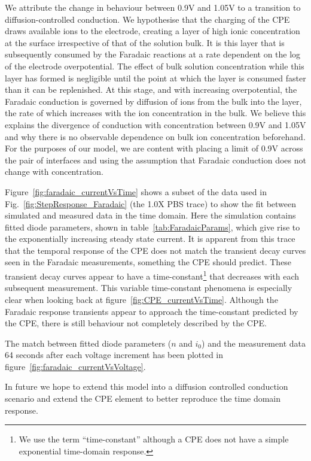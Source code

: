 \documentclass[journal, a4paper]{IEEEtran}
\begin{document}
We attribute the change in behaviour between 0.9\thinspace V and 1.05\thinspace V to a transition to diffusion-controlled conduction.
We hypothesise that the charging of the CPE draws available ions to the electrode, creating a layer of high ionic concentration at the surface irrespective of that of the solution bulk. It is this layer that is subsequently consumed by the Faradaic reactions at a rate dependent on the log of the electrode overpotential.  The effect of bulk solution concentration while this layer has formed is negligible until the point at which the layer is consumed faster than it can be replenished. At this stage, and with increasing overpotential, the Faradaic conduction is governed by diffusion of ions from the bulk into the layer, the rate of which increases with the ion concentration in the bulk. We believe this explains the divergence of conduction with concentration between 0.9\thinspace V and 1.05\thinspace V and why there is no observable dependence on bulk ion concentration beforehand.
For the purposes of our model, we are content with placing a limit of 0.9\thinspace V across the pair of interfaces and using the assumption that Faradaic conduction does not change with concentration.

{
    \color{blue}
    Figure~\ref{fig:faradaic_currentVsTime} shows a subset of the data used in Fig.~\ref{fig:StepResponse_Faradaic} (the 1.0X PBS trace) to show the fit between simulated and measured data in the time domain. Here the simulation contains fitted diode parameters, shown in table~\ref{tab:FaradaicParams}, which give rise to the exponentially increasing steady state current.
It is apparent from this trace that the temporal response of the CPE does not match the transient decay curves seen in the Faradaic measurements, something the CPE should predict. These transient decay curves appear to have a time-constant\footnote{We use the term ``time-constant'' although a CPE does not have a simple exponential time-domain response.} that decreases with each subsequent measurement. This variable time-constant phenomena is especially clear when looking back at figure~\ref{fig:CPE_currentVsTime}. Although the Faradaic response transients appear to approach the time-constant predicted by the CPE, there is still behaviour not completely described by the CPE.

The match between fitted diode parameters ($n$ and $i_{0}$) and the measurement data 64 seconds after each voltage increment has been plotted in figure~\ref{fig:faradaic_currentVsVoltage}.

In future we hope to extend this model into a diffusion controlled conduction scenario and extend the CPE element to better reproduce the time domain response.
}
\end{document}
